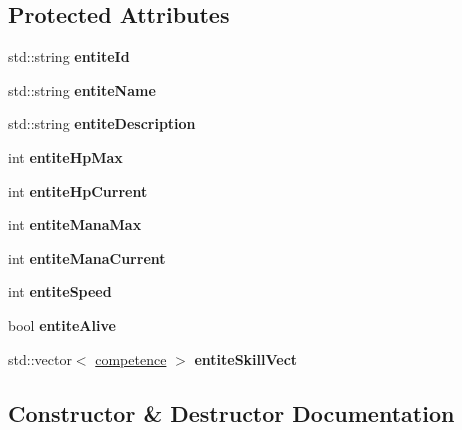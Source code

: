 \subsection*{Protected Attributes}
\begin{DoxyCompactItemize}
\item 
\mbox{\label{classentite_a904e8783de9fe2fc4306bf6b7822d025}} 
std\+::string {\bfseries entite\+Id}
\item 
\mbox{\label{classentite_abe631a515b1cd0866dcfb078c4ceb07a}} 
std\+::string {\bfseries entite\+Name}
\item 
\mbox{\label{classentite_a6fab1d9a04ade2cb97ec0904b12c82c9}} 
std\+::string {\bfseries entite\+Description}
\item 
\mbox{\label{classentite_a754557f56c1c1fcbcbd40eec68b60f65}} 
int {\bfseries entite\+Hp\+Max}
\item 
\mbox{\label{classentite_a09661bc80d898530a760153f6b690070}} 
int {\bfseries entite\+Hp\+Current}
\item 
\mbox{\label{classentite_a696167d32c27b3b2a2fa6b473a888b18}} 
int {\bfseries entite\+Mana\+Max}
\item 
\mbox{\label{classentite_ae194ea6eb360db3882fc0559a144899b}} 
int {\bfseries entite\+Mana\+Current}
\item 
\mbox{\label{classentite_ad9df70a9bb07f07b3ebf520941c3a35f}} 
int {\bfseries entite\+Speed}
\item 
\mbox{\label{classentite_a5a69c21a4435817f2d960e0811d4474e}} 
bool {\bfseries entite\+Alive}
\item 
\mbox{\label{classentite_ad9d38b74abc49ec4fba0fcb27f4edaa9}} 
std\+::vector$<$ \hyperlink{classcompetence}{competence} $>$ {\bfseries entite\+Skill\+Vect}
\end{DoxyCompactItemize}


\subsection{Constructor \& Destructor Documentation}
\mbox{\label{classentite_a5e655b5c1999ae75dfca0b32de737b1e}} 
